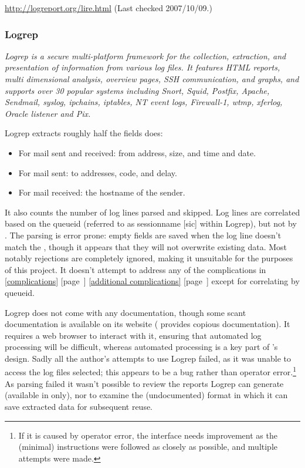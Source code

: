 \documentclass[a4paper,12pt,draft]{article}
\newcommand{\parsername}{\PLP{}}
\newcommand{\parsernames}{\PLP{}'s}
\newcommand{\refwithpage}[1]{%
    \empty{}\ref{#1} [page~\pageref{#1}]%
}
\newcommand{\sectionref}[1]{%
    \textsection{}\refwithpage{#1}%
}
\begin{document}
\url{http://logreport.org/lire.html} \newline (Last checked 2007/10/09.)

\subsubsection{Logrep}

\textit{Logrep is a secure multi-platform framework for the collection,
extraction, and presentation of information from various log files. It
features HTML reports, multi dimensional analysis, overview pages, SSH
communication, and graphs, and supports over 30 popular systems including
Snort, Squid, Postfix, Apache, Sendmail, syslog, ipchains, iptables, NT
event logs, Firewall-1, wtmp, xferlog, Oracle listener and Pix.\/}

Logrep extracts roughly half the fields \parsername{} does:

\begin{itemize}

    \item For mail sent and received: from address, size, and time and
        date.

    \item For mail sent: to addresses, \SMTP{} code, and delay.

    \item For mail received: the hostname of the sender.

\end{itemize}

It also counts the number of log lines parsed and skipped.  Log lines are
correlated based on the queueid (referred to as sessionname [sic] within
Logrep), but not by \pid{}.  The parsing is error prone: empty fields are
saved when the log line doesn't match the \regex{}, though it appears that
they will not overwrite existing data.  Most notably rejections are
completely ignored, making it unsuitable for the purposes of this project.
It doesn't attempt to address any of the complications in
\sectionref{complications} \sectionref{additional complications} except for
correlating by queueid.

Logrep does not come with any documentation, though some scant
documentation is available on its website (\parsername{} provides copious
documentation).  It requires a web browser to interact with it, ensuring
that automated log processing will be difficult, whereas automated
processing is a key part of \parsernames{} design.  Sadly all the author's
attempts to use Logrep failed, as it was unable to access the log files
selected; this appears to be a bug rather than operator error.\footnote{If
it is caused by operator error, the interface needs improvement as the
(minimal) instructions were followed as closely as possible, and multiple
attempts were made.}  As parsing failed it wasn't possible to review the
reports Logrep can generate (available in \HTML{} only), nor to examine the
(undocumented) format in which it can save extracted data for subsequent
reuse.
\end{document}
